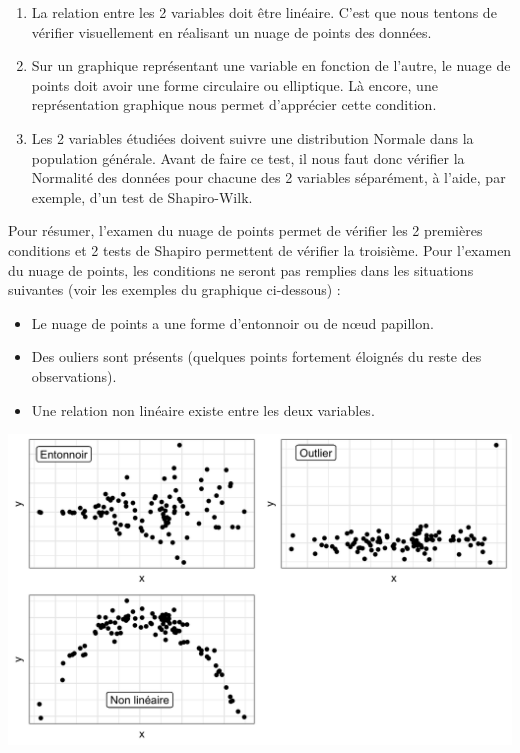\documentclass[a4paperpaper,]{article}
\providecommand{\tightlist}{%
  \setlength{\itemsep}{0pt}\setlength{\parskip}{0pt}}
\begin{document}
\begin{enumerate}
\def\labelenumi{\arabic{enumi}.}
\tightlist
\item
  La relation entre les 2 variables doit être linéaire. C'est que nous tentons de vérifier visuellement en réalisant un nuage de points des données.
\item
  Sur un graphique représentant une variable en fonction de l'autre, le nuage de points doit avoir une forme circulaire ou elliptique. Là encore, une représentation graphique nous permet d'apprécier cette condition.
\item
  Les 2 variables étudiées doivent suivre une distribution Normale dans la population générale. Avant de faire ce test, il nous faut donc vérifier la Normalité des données pour chacune des 2 variables séparément, à l'aide, par exemple, d'un test de Shapiro-Wilk.
\end{enumerate}

Pour résumer, l'examen du nuage de points permet de vérifier les 2 premières conditions et 2 tests de Shapiro permettent de vérifier la troisième. Pour l'examen du nuage de points, les conditions ne seront pas remplies dans les situations suivantes (voir les exemples du graphique ci-dessous) :

\begin{itemize}
\tightlist
\item
  Le nuage de points a une forme d'entonnoir ou de nœud papillon.
\item
  Des ouliers sont présents (quelques points fortement éloignés du reste des observations).
\item
  Une relation non linéaire existe entre les deux variables.
\end{itemize}

\begin{center}\includegraphics[width=0.9\linewidth]{figure/unnamed-chunk-106-1} \end{center}
\end{document}

